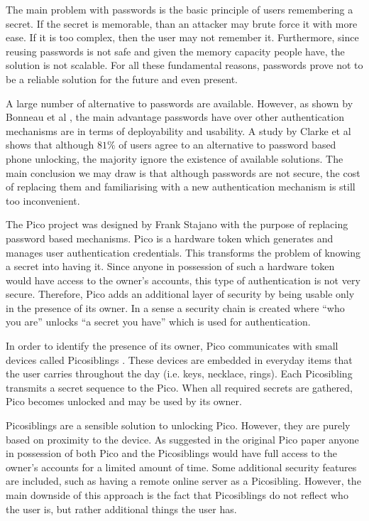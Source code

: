 The main problem with passwords is the basic principle of users remembering a secret. If the secret is memorable, than an attacker may brute force it with more ease. If it is too complex, then the user may not remember it. Furthermore, since reusing passwords is not safe and given the memory capacity people have, the solution is not scalable. For all these fundamental reasons, passwords prove not to be a reliable solution for the future and even present.

A large number of alternative to passwords are available. However, as shown by Bonneau et al \cite{bonneau2012quest}, the main advantage passwords have over other authentication mechanisms are in terms of deployability and usability. A study by Clarke et al \cite{clarke2002acceptance} shows that although $81\%$ of users agree to an alternative to password based phone unlocking, the majority ignore the existence of available solutions. The main conclusion we may draw is that although passwords are not secure, the cost of replacing them and familiarising with a new authentication mechanism is still too inconvenient. 

The Pico project was designed by Frank Stajano \cite{stajano2011pico} with the purpose of replacing password based mechanisms. Pico is a hardware token which generates and manages user authentication credentials. This transforms the problem of knowing a secret into having it. Since anyone in possession of such a hardware token would have access to the owner's accounts, this type of authentication is not very secure. Therefore, Pico adds an additional layer of security by being usable only in the presence of its owner. In a sense a security chain is created where ``who you are'' unlocks ``a secret you have'' which is used for authentication.

In order to identify the presence of its owner, Pico communicates with small devices called Picosiblings \cite{stannard2012good}. These devices are embedded in everyday items that the user carries throughout the day (i.e. keys, necklace, rings). Each Picosibling transmits a secret sequence to the Pico. When all required secrets are gathered, Pico becomes unlocked and may be used by its owner.

Picosiblings are a sensible solution to unlocking Pico. However, they are purely based on proximity to the device. As suggested in the original Pico paper \cite{stajano2011pico} anyone in possession of both Pico and the Picosiblings would have full access to the owner's accounts for a limited amount of time. Some additional security features are included, such as having a remote online server as a Picosibling. However, the main downside of this approach is the fact that Picosiblings do not reflect who the user is, but rather additional things the user has.

